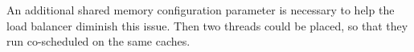 An additional shared memory configuration parameter is necessary to help the
load balancer diminish this issue.
Then two threads could be placed, so that they run co-scheduled on the same
caches.



\begin{comment}
\paragraph{Pseudo-code of placement algorithm}
  \begin{verbatim}
  from all threads:
    select #core highest LLC miss rate
    select #core highest exec-time
    intersection of both are critical threads
    if threads placed on different cores
      then do nothing
    else
      move higher LLC miss rate thread to other core
    do accounting

  forall threads left do:
    bin by priority levels
    sort each bin by miss rate

  forall prio-bin in prio-bin-list do:
    while threads in prio-bin
      dequeue highest miss rate
      sort cores by lowest accounted miss rate
      place max(#core, #threads left in bin) threads RR on cores;
  \end{verbatim}

  \paragraph{\gls{smt} abstraction code}
  \begin{verbatim}
  if SMT is enabled
    sort threads once by exec time and once by LLC miss
    while duplication:
      look at next LLC-miss thread and dequeue it from exec-time
      look at next exec-miss thread and dequeue it from LLC-miss

    while threads unassigned && queue not empty:
      dequeue one thread from LLC miss list for SMT#0
      dequeue one thread from LLC-miss list for SMT#1
      dequeue one thread from exe-time list for SMT#0
      dequeue one thread form exec-time list for SMT#1
  \end{verbatim}

  \paragraph{Minimize migration pseudo-code}
  \begin{verbatim}
  sort all threads by LLC-miss
  sliding window size #threads with less than 5% LLC miss difference
  if at least 2 threads in the current window are migrated
    if two threads are swaping cores
      don't do the migration
    ALTERNATIVELY
    if the from-core-to-core-matrix has entries on opposing fields
      swap the to-values of both entries
  \end{verbatim}

\end{comment}

